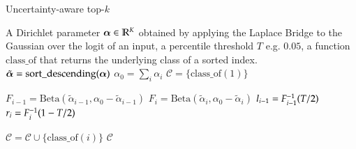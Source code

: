 \begin{algorithm}[tb]
   \caption{Uncertainty-aware top-$k$}
   \label{alg:ua-top-k}
    \begin{algorithmic}
        \REQUIRE A Dirichlet parameter ${\boldsymbol{\alpha}} \in \mathbb{R}^K$ obtained by applying the Laplace Bridge to the Gaussian over the logit of an input, a percentile threshold $T$ e.g. $0.05$, a function $\mathrm{class\_of}$ that returns the underlying class of a sorted index.
        \STATE
        \STATE $\tilde{{\boldsymbol{\alpha}}} = \mathrm{sort\_descending}({\boldsymbol{\alpha}})$ 
        \STATE $\alpha_0 = \sum_i \alpha_i$
        \STATE $\mathcal{C} = \{ \mathrm{class\_of}(1) \}$ 

            \STATE $F_{i-1} = \mathrm{Beta}(\tilde{\alpha}_{i-1}, \alpha_0 - \tilde{\alpha}_{i-1})$ 
            \STATE $F_{i} = \mathrm{Beta}(\tilde{\alpha}_i, \alpha_0 - \tilde{\alpha}_i)$ 
            \STATE $l_{i-1} = F_{i-1}^{-1}(T/2)$  
            \STATE $r_{i} = F_i^{-1}(1-T/2)$ 

                \STATE $\mathcal{C} = \mathcal{C} \cup \{ \mathrm{class\_of}(i) \}$  
            \ELSE
                \BREAK {}
            \ENDIF
        \ENDFOR
        \STATE
        \ENSURE $\mathcal{C}$ 
    \end{algorithmic}
\end{algorithm}



